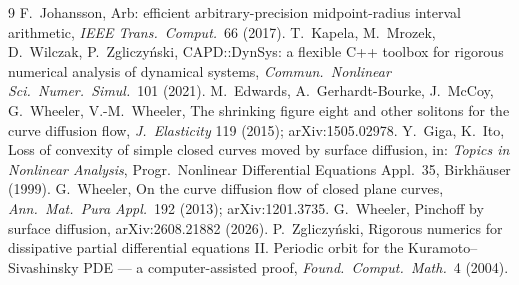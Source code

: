 \documentclass[11pt]{article}
\theoremstyle{definition}
\theoremstyle{remark}
\begin{document}
\begin{thebibliography}{9}\small
{} F.~Johansson, Arb: efficient arbitrary-precision midpoint-radius interval arithmetic, \emph{IEEE Trans.\ Comput.}\ 66 (2017).
 T.~Kapela, M.~Mrozek, D.~Wilczak, P.~Zgliczy\'nski, CAPD::DynSys: a flexible C++ toolbox for rigorous numerical analysis of dynamical systems, \emph{Commun.\ Nonlinear Sci.\ Numer.\ Simul.}\ 101 (2021).
 M.~Edwards, A.~Gerhardt-Bourke, J.~McCoy, G.~Wheeler, V.-M.~Wheeler, The shrinking figure eight and other solitons for the curve diffusion flow, \emph{J.\ Elasticity} 119 (2015); arXiv:1505.02978.
 Y.~Giga, K.~Ito, Loss of convexity of simple closed curves moved by surface diffusion, in: \emph{Topics in Nonlinear Analysis}, Progr.\ Nonlinear Differential Equations Appl.\ 35, Birkh\"auser (1999).
 G.~Wheeler, On the curve diffusion flow of closed plane curves, \emph{Ann.\ Mat.\ Pura Appl.}\ 192 (2013); arXiv:1201.3735.
 G.~Wheeler, Pinchoff by surface diffusion, arXiv:2608.21882 (2026).
 P.~Zgliczy\'nski, Rigorous numerics for dissipative partial differential equations II. Periodic orbit for the Kuramoto--Sivashinsky PDE --- a computer-assisted proof, \emph{Found.\ Comput.\ Math.}\ 4 (2004).
\end{thebibliography}
\end{document}
